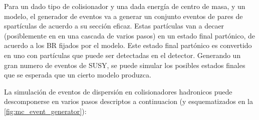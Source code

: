 Para un dado tipo de colisionador y una dada energía de centro de masa, y un
modelo, el generador de eventos va a generar un conjunto eventos de pares de
spartículas de acuerdo a su sección eficaz. Estas partículas van a decaer
(posiblemente en en una cascada de varios pasos) en un estado final partónico,
de acuerdo a los BR fijados por el modelo. Este estado final partónico es
convertido en uno con partículas que puede ser detectadas en el detector.
Generando un gran numero de eventos de SUSY, se puede simular los posibles
estados finales que se esperada que un cierto modelo produzca.


La simulación de eventos de dispersión en colisionadores hadronicos puede
descomponerse en varios pasos descriptos a continuacion (y esquematizados en la
\cref{fig:mc_event_generator}):

